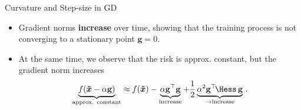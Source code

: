 \documentclass[11pt,compress,t,notes=noshow, xcolor=table]{beamer}
\begin{document}
\begin{vbframe}{Curvature and Step-size in GD}
\begin{itemize}
\vspace*{-0.1cm}

\item Gradient norms \textbf{increase} over time, showing that the training process is not converging to a stationary point $\mathbf{g} = 0$. 
\item At the same time, we observe that the risk is approx. constant, but the gradient norm increases
\vspace*{-0.2cm}
$$
\underbrace{f(\bm{\tilde{x}}-\alpha \mathbf{g})}_{\text{approx. constant}} \approx f(\bm{\tilde{x}}) - \underbrace{\alpha \mathbf{g}^\top\mathbf{g}}_{\text{increase}}+ \frac{1}{2}  \underbrace{\alpha^2 \mathbf{g}^\top\!\Hess\,\mathbf{g}}_{\to \text{increase}}  \,. 
$$ 
\end{itemize}
\end{vbframe}


	
	
	
	
	
	
	
\end{document}
